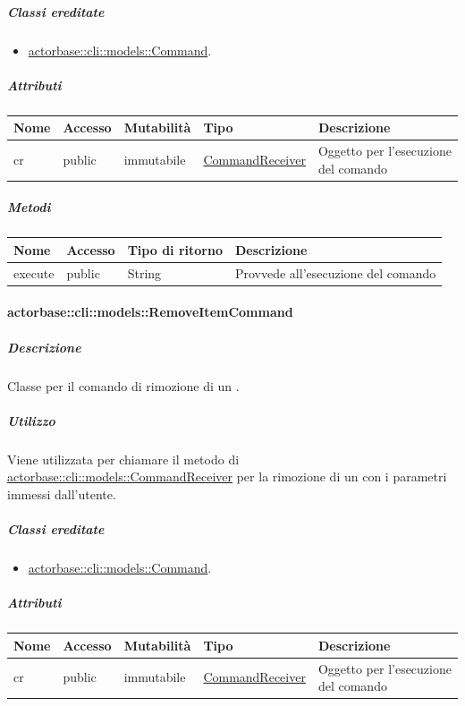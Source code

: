 \documentclass{scalatekids-article}
\begin{document}
\subparagraph{Classi ereditate}

\begin{itemize}
\item \hyperref[sec:actorbase::cli::models::Command]{actorbase::cli::models::Command}.
\end{itemize}

\subparagraph{Attributi}

\begin{tabular}{| p{1cm} | p{1.5cm} | p{2cm} | p{4cm} | p{8.5cm} |}
  \hline
  Nome & Accesso & Mutabilità & Tipo & Descrizione\\
  \hline
  cr & public & immutabile & \hyperref[sec:actorbase::cli::models::CommandReceiver]{CommandReceiver} & Oggetto per l'esecuzione del comando\\
  \hline
\end{tabular}

\subparagraph{Metodi}

\begin{tabular}{| l | l | l | l |}
  \hline
  Nome & Accesso & Tipo di ritorno & Descrizione\\
  \hline
  execute & public & String & Provvede all'esecuzione del comando\\
  \hline
\end{tabular}

\paragraph{actorbase::cli::models::RemoveItemCommand}
\label{sec:actorbase::cli::models::RemoveItemCommand}

\subparagraph{Descrizione}

Classe per il comando di rimozione di un .

\subparagraph{Utilizzo}

Viene utilizzata per chiamare il metodo di
\hyperref[sec:actorbase::cli::models::CommandReceiver]{actorbase::cli::models::CommandReceiver} per la rimozione di un 
con i parametri immessi dall'utente.

\subparagraph{Classi ereditate}

\begin{itemize}
\item \hyperref[sec:actorbase::cli::models::Command]{actorbase::cli::models::Command}.
\end{itemize}

\subparagraph{Attributi}

\begin{tabular}{| p{1cm} | p{1.5cm} | p{2cm} | p{4cm} | p{8.5cm} |}
  \hline
  Nome & Accesso & Mutabilità & Tipo & Descrizione\\
  \hline
  cr & public & immutabile & \hyperref[sec:actorbase::cli::models::CommandReceiver]{CommandReceiver} & Oggetto per l'esecuzione del comando\\
  \hline
\end{tabular}
\end{document}

